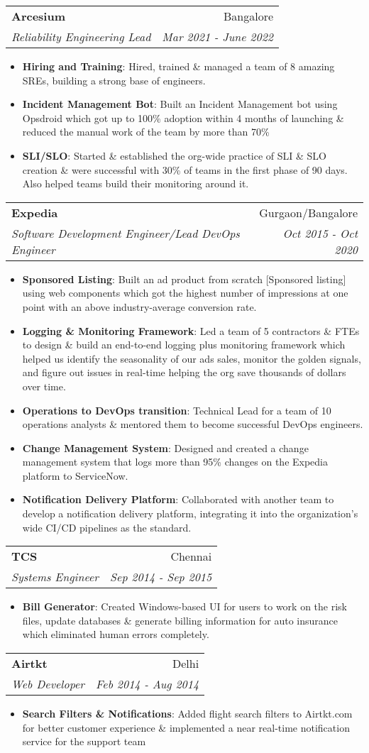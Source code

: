 \documentclass[letterpaper,11pt]{article}
\makeatletter
\newcommand{\resumeItem}[2]{
  \item\small{
    \textbf{#1}{: #2 \vspace{-2pt}}
  }
}
\newcommand{\resumeSubheading}[4]{
  \vspace{-1pt}\item
    \begin{tabular*}{0.97\textwidth}{l@{\extracolsep{\fill}}r}
      \textbf{#1} & #2 \\
      \textit{\small#3} & \textit{\small #4} \\
    \end{tabular*}\vspace{-5pt}
}
\newcommand{\resumeItemListStart}{\begin{itemize}}
\newcommand{\resumeItemListEnd}{\end{itemize}\vspace{-5pt}}
\makeatother
\begin{document}
    \resumeSubheading
      {Arcesium}{Bangalore}
      {Reliability Engineering Lead}{Mar 2021 - June 2022}
      \resumeItemListStart
        \resumeItem{Hiring and Training}
          {Hired, trained \& managed a team of 8 amazing SREs, building a strong base of engineers.}
        \resumeItem{Incident Management Bot}
          {Built an Incident Management bot using Opsdroid which got up to 100\% adoption within 4 months of launching \& reduced the manual work of the team by more than 70\%}
        \resumeItem{SLI/SLO}
          {Started \& established the org-wide practice of SLI \& SLO creation \& were successful with 30\% of teams in the first phase of 90 days. Also helped teams build their monitoring around it.}
      \resumeItemListEnd

    \resumeSubheading
      {Expedia}{Gurgaon/Bangalore}
      {Software Development Engineer/Lead DevOps Engineer}{Oct 2015 - Oct 2020}
      \resumeItemListStart
        \resumeItem{Sponsored Listing}
          {Built an ad product from scratch [Sponsored listing] using web components which got the highest number of impressions at one point with an above industry-average conversion rate.}
        \resumeItem{Logging \& Monitoring Framework}
          {Led a team of 5 contractors \& FTEs to design \& build an end-to-end logging plus monitoring framework which helped us identify the seasonality of our ads sales, monitor the golden signals, and figure out issues in real-time helping the org save thousands of dollars over time.}
        \resumeItem{Operations to DevOps transition}
          {Technical Lead for a team of 10 operations analysts \& mentored them to become successful DevOps engineers.}
        \resumeItem{Change Management System}
          {Designed and created a change management system that logs more than 95\% changes on the Expedia platform to ServiceNow.}
        \resumeItem{Notification Delivery Platform}
          {Collaborated with another team to develop a notification delivery platform, integrating it into the organization's wide CI/CD pipelines as the standard.}
      \resumeItemListEnd

    \resumeSubheading
      {TCS}{Chennai}
      {Systems Engineer}{Sep 2014 - Sep 2015}
      \resumeItemListStart
        \resumeItem{Bill Generator}
          {Created Windows-based UI for users to work on the risk files, update databases \& generate billing information for auto insurance which eliminated human errors completely.}
      \resumeItemListEnd

    \resumeSubheading
      {Airtkt}{Delhi}
      {Web Developer}{Feb 2014 - Aug 2014}
      \resumeItemListStart
        \resumeItem{Search Filters \& Notifications}
          {Added flight search filters to Airtkt.com for better customer experience \& implemented a near real-time notification service for the support team}
      \resumeItemListEnd
\end{document}
